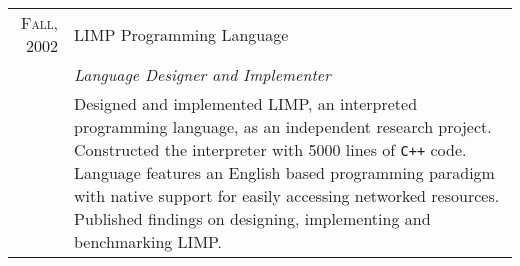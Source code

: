 \documentclass[a4paper,10pt]{article} %
\begin{document}
\begin{tabular}{r|p{11cm}}
\textsc{Fall, 2002} & LIMP Programming Language \\
& \emph{Language Designer and Implementer} \\
& \footnotesize{Designed and implemented LIMP, an interpreted programming language, as an independent research project. Constructed the interpreter with 5000 lines of \texttt{C++} code. Language features an English based programming paradigm with native support for easily accessing networked resources. Published findings on designing, implementing and benchmarking LIMP.} \\

\end{tabular}


\end{document}
